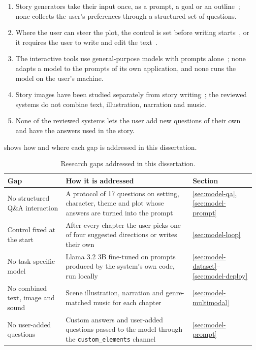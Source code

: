 \begin{enumerate}
    \item Story generators take their input once, as a prompt, a goal or an outline~\cite{fan2018hierarchical,yao2019planwrite,rashkin2020plotmachines,yang2022re3}; none collects the user's preferences through a structured set of questions.
    \item Where the user can steer the plot, the control is set before writing starts~\cite{tambwekar2019reward,yang2023doc}, or it requires the user to write and edit the text~\cite{yuan2022wordcraft,chung2022talebrush}.
    \item The interactive tools use general-purpose models with prompts alone~\cite{yuan2022wordcraft,mirowski2023dramatron}; none adapts a model to the prompts of its own application, and none runs the model on the user's machine.
    \item Story images have been studied separately from story writing~\cite{liu2024grimm}; the reviewed systems do not combine text, illustration, narration and music.
    \item None of the reviewed systems lets the user add new questions of their own and have the answers used in the story.
\end{enumerate}

 shows how and where each gap is addressed in this dissertation.

\begin{table}[H]
\centering
\caption{Research gaps addressed in this dissertation.}
\label{tab:gap}
\renewcommand{\arraystretch}{1.25}
\small
\begin{tabular}{@{}p{3.6cm}p{7.6cm}p{2.1cm}@{}}
\toprule
\textbf{Gap} & \textbf{How it is addressed} & \textbf{Section} \\
\midrule
No structured Q\&A interaction & A protocol of 17 questions on setting, character, theme and plot whose answers are turned into the prompt & \ref{sec:model-qa}, \ref{sec:model-prompt} \\
Control fixed at the start & After every chapter the user picks one of four suggested directions or writes their own & \ref{sec:model-loop} \\
No task-specific model & Llama 3.2 3B fine-tuned on prompts produced by the system's own code, run locally & \ref{sec:model-dataset}--\ref{sec:model-deploy} \\
No combined text, image and sound & Scene illustration, narration and genre-matched music for each chapter & \ref{sec:model-multimodal} \\
No user-added questions & Custom answers and user-added questions passed to the model through the \texttt{custom\_elements} channel & \ref{sec:model-prompt} \\
\bottomrule
\end{tabular}
\end{table}

